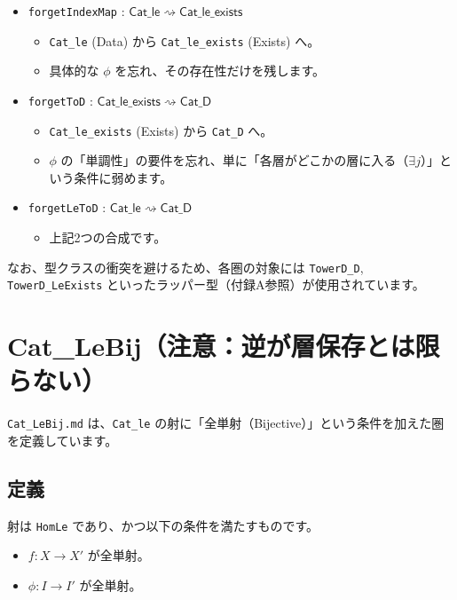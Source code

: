 \documentclass[judge=standard,11pt]{jlreq}
\theoremstyle{definition}
\newcommand{\CatD}{\mathsf{Cat\_D}}
\newcommand{\CatLe}{\mathsf{Cat\_le}}
\newcommand{\CatLeExists}{\mathsf{Cat\_le\_exists}}
\begin{document}
\begin{itemize}
    \item \texttt{forgetIndexMap} : $\CatLe \rightsquigarrow \CatLeExists$
    \begin{itemize}
        \item \texttt{Cat\_le} (Data) から \texttt{Cat\_le\_exists} (Exists) へ。
        \item 具体的な $\phi$ を忘れ、その存在性だけを残します。
    \end{itemize}
    
    \item \texttt{forgetToD} : $\CatLeExists \rightsquigarrow \CatD$
    \begin{itemize}
        \item \texttt{Cat\_le\_exists} (Exists) から \texttt{Cat\_D} へ。
        \item $\phi$ の「単調性」の要件を忘れ、単に「各層がどこかの層に入る（$\exists j$）」という条件に弱めます。
    \end{itemize}

    \item \texttt{forgetLeToD} : $\CatLe \rightsquigarrow \CatD$
    \begin{itemize}
        \item 上記2つの合成です。
    \end{itemize}
\end{itemize}

なお、型クラスの衝突を避けるため、各圏の対象には \texttt{TowerD\_D}, \texttt{TowerD\_LeExists} といったラッパー型（付録A参照）が使用されています。

\section{Cat\_LeBij（注意：逆が層保存とは限らない）}

\texttt{Cat\_LeBij.md} は、\texttt{Cat\_le} の射に「全単射（Bijective）」という条件を加えた圏を定義しています。

\subsection{定義}
射は \texttt{HomLe} であり、かつ以下の条件を満たすものです。
\begin{itemize}
    \item $f: X \to X'$ が全単射。
    \item $\phi: I \to I'$ が全単射。
\end{itemize}
\end{document}

